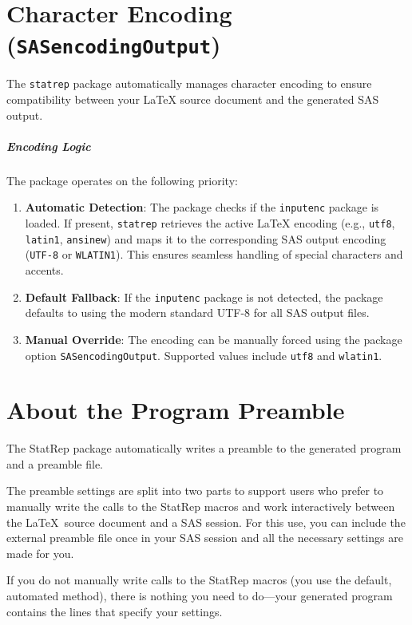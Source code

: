 \documentclass[article,oneside]{memoir}
\newcommand*{\StatRep}{\textsf{StatRep}\xspace}
\begin{document}
 \chapter{Character Encoding (\texttt{SASencodingOutput})}
 
 The \texttt{statrep} package automatically manages character encoding to ensure compatibility between your \LaTeX{} source document and the generated SAS output.
 
 \paragraph{Encoding Logic}
 The package operates on the following priority:
 \begin{enumerate}
 	\item \textbf{Automatic Detection}: The package checks if the \texttt{inputenc} package is loaded. If present, \texttt{statrep} retrieves the active \LaTeX{} encoding (e.g., \texttt{utf8}, \texttt{latin1}, \texttt{ansinew}) and maps it to the corresponding SAS output encoding (\texttt{UTF-8} or \texttt{WLATIN1}). This ensures seamless handling of special characters and accents.
 	\item \textbf{Default Fallback}: If the \texttt{inputenc} package is not detected, the package defaults to using the modern standard UTF-8 for all SAS output files.
 	\item \textbf{Manual Override}: The encoding can be manually forced using the package option \texttt{SASencodingOutput}. Supported values include \texttt{utf8} and \texttt{wlatin1}.
 \end{enumerate}
 

 \chapter{About the Program Preamble}

The \StatRep package automatically writes a preamble to the generated program and a preamble file.

The preamble settings are split into two parts to support users who prefer to
manually write the calls to the \StatRep macros and work interactively between the
\LaTeX\ source document and a SAS session.  For this use, you can include the external
preamble file once in your SAS session and all the necessary settings are made for you.

If you do not manually write calls to the \StatRep macros (you use the default, automated method),
there is nothing you need to do---your generated program contains the lines that specify your settings.
\end{document}
